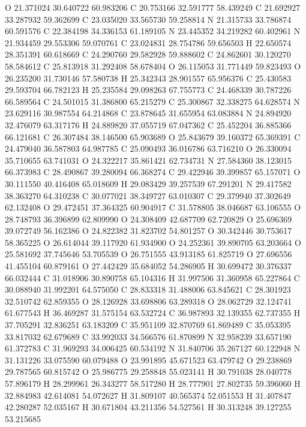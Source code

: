 \documentclass{article}
\begin{document}
O 21.371024 30.640722 60.983206
C 20.753166 32.591777 58.439249
C 21.692927 33.287932 59.362699
C 23.035020 33.565730 59.258814
N 21.315733 33.786874 60.591576
C 22.384198 34.336153 61.189105
N 23.445352 34.219282 60.402961
N 21.934459 29.553306 59.070761
C 23.024831 28.754786 59.656503
H 22.650574 28.351391 60.618669
C 24.290760 29.582928 59.888602
C 24.862601 30.120270 58.584612
C 25.813918 31.292408 58.678404
O 26.115053 31.771449 59.823493
O 26.235200 31.730146 57.580738
H 25.342343 28.901557 65.956376
C 25.430583 29.593704 66.782123
H 25.235584 29.098263 67.755773
C 24.468339 30.787226 66.589564
C 24.501015 31.386800 65.215279
C 25.300867 32.338275 64.628574
N 23.629116 30.987554 64.214868
C 23.878645 31.655954 63.083884
N 24.894920 32.476079 63.317176
H 24.889820 37.055719 67.047362
C 25.452204 36.885366 66.121681
C 26.307484 38.146500 65.903689
O 25.843679 39.160372 65.369391
C 24.479040 36.587803 64.987785
C 25.090493 36.016786 63.716210
O 26.330094 35.710655 63.741031
O 24.322217 35.861421 62.734731
N 27.584360 38.123015 66.373983
C 28.490867 39.280094 66.368274
C 29.422946 39.399857 65.157071
O 30.111550 40.416408 65.018609
H 29.083429 39.257539 67.291201
N 29.417582 38.363270 64.310238
C 30.077021 38.349727 63.010307
C 29.379940 37.302649 62.132408
O 29.472451 37.364325 60.904917
C 31.578805 38.046687 63.106555
O 28.748793 36.396899 62.809990
O 24.308409 42.687709 62.720829
O 25.696369 39.072749 56.162386
O 24.822382 31.823702 54.801257
O 30.342446 30.753617 58.365225
O 26.614044 39.117920 61.934900
O 24.252361 39.890705 63.203664
O 25.581692 37.745646 53.705539
O 26.751555 43.913185 61.825719
O 27.696556 41.455104 60.879161
O 27.442429 35.684052 54.286905
H 30.699472 30.376337 66.032444
C 31.018906 30.890758 65.104316
H 31.997506 31.360958 65.227864
C 30.088940 31.992201 64.575050
C 28.833318 31.488006 63.845621
C 28.301923 32.510742 62.859355
O 28.126928 33.698806 63.289318
O 28.062729 32.124741 61.677543
H 36.469287 31.575154 63.532724
C 36.987893 32.139355 62.737355
H 37.705291 32.836251 63.183209
C 35.951109 32.870769 61.869489
C 35.053395 33.817032 62.679689
C 33.992033 34.566576 61.870899
N 32.958239 33.657190 61.372783
C 31.969293 34.006425 60.534192
N 31.840706 35.267127 60.122948
N 31.131226 33.075590 60.079488
O 23.991895 45.671523 63.479742
O 29.238869 29.787565 60.815742
O 25.986775 29.258848 55.023141
H 30.791038 28.040778 57.896179
H 28.299961 26.343277 58.517280
H 28.777901 27.802735 59.396060
H 32.884983 42.614081 54.072627
H 31.809107 40.565374 52.051553
H 31.407847 42.280287 52.035167
H 30.671804 43.211356 54.527561
H 30.313248 39.127255 53.215685
\end{document}

